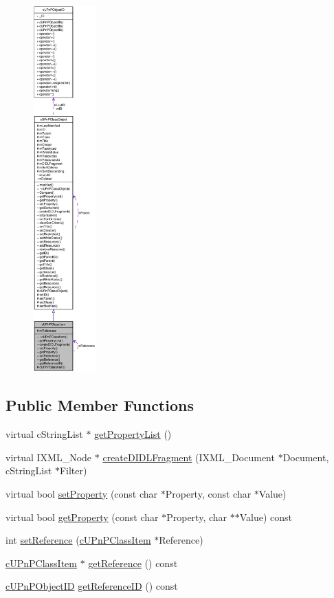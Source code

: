 \begin{figure}[H]
\begin{center}
\leavevmode
\includegraphics[height=400pt]{classcUPnPClassItem__coll__graph}
\end{center}
\end{figure}
\subsection*{Public Member Functions}
\begin{CompactItemize}
\item 
virtual cStringList $\ast$ \hyperlink{classcUPnPClassItem_add0c9d378036e270e6f99d8d1409e3b}{getPropertyList} ()
\item 
virtual IXML\_\-Node $\ast$ \hyperlink{classcUPnPClassItem_5385975d79cd8e8b78429ecfe11b30a7}{createDIDLFragment} (IXML\_\-Document $\ast$Document, cStringList $\ast$Filter)
\item 
virtual bool \hyperlink{classcUPnPClassItem_ab17057659c17792a5b67f4297ade642}{setProperty} (const char $\ast$Property, const char $\ast$Value)
\item 
virtual bool \hyperlink{classcUPnPClassItem_31f7010baa65cc25b95a864f05eb4e62}{getProperty} (const char $\ast$Property, char $\ast$$\ast$Value) const 
\item 
int \hyperlink{classcUPnPClassItem_79153d8d7b4ac30af0af0146d69c8e83}{setReference} (\hyperlink{classcUPnPClassItem}{cUPnPClassItem} $\ast$Reference)
\item 
\hyperlink{classcUPnPClassItem}{cUPnPClassItem} $\ast$ \hyperlink{classcUPnPClassItem_153dcb71951d47891d1e066f97e6cd29}{getReference} () const 
\item 
\hyperlink{structcUPnPObjectID}{cUPnPObjectID} \hyperlink{classcUPnPClassItem_c269fe6cfe8846722b90810a21e42bfc}{getReferenceID} () const 
\end{CompactItemize}
